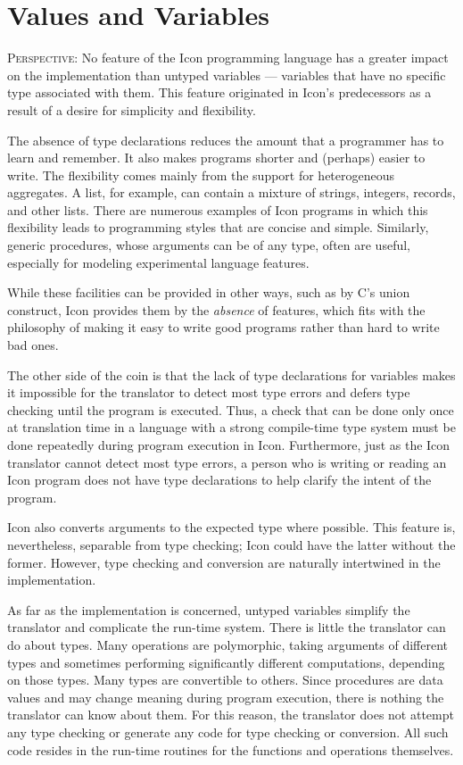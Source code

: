 \chapter{Values and Variables}
\label{VV-Chapter}

\textsc{Perspective}: No feature of the Icon programming language has
a greater impact on the implementation than untyped
variables --- variables that have no specific type associated with
them. This feature originated in Icon's predecessors as a result of a
desire for simplicity and flexibility.

The absence of type declarations reduces the amount that a programmer
has to learn and remember. It also makes programs shorter and
(perhaps) easier to write. The flexibility comes mainly from the
support for heterogeneous aggregates. A list, for example, can contain
a mixture of strings, integers, records, and other lists. There are
numerous examples of Icon programs in which this flexibility leads to
programming styles that are concise and simple. Similarly,
{\textquotedbl}generic{\textquotedbl} procedures, whose arguments can
be of any type, often are useful, especially for modeling experimental
language features.

While these facilities can be provided in other ways, such as by C's
union construct, Icon provides them by the \textit{absence} of
features, which fits with the philosophy of making it easy to write
good programs rather than hard to write bad ones.

The other side of the coin is that the lack of type declarations for
variables makes it impossible for the translator to detect most type
errors and defers type checking until the program is executed. Thus, a
check that can be done only once at translation time in a language
with a strong compile-time type system must be done repeatedly during
program execution in Icon. Furthermore, just as the Icon translator
cannot detect most type errors, a person who is writing or reading an
Icon program does not have type declarations to help clarify the
intent of the program.

Icon also converts arguments to the expected type where possible. This
feature is, nevertheless, separable from type checking; Icon could
have the latter without the former. However, type checking and
conversion are naturally intertwined in the implementation.

As far as the implementation is concerned, untyped variables simplify
the translator and complicate the run-time system.  There is little
the translator can do about types. Many operations are polymorphic,
taking arguments of different types and sometimes performing
significantly different computations, depending on those types. Many
types are convertible to others. Since procedures are data values and
may change meaning during program execution, there is nothing the
translator can know about them. For this reason, the translator does
not attempt any type checking or generate any code for type checking
or conversion. All such code resides in the run-time routines for the
functions and operations themselves.

